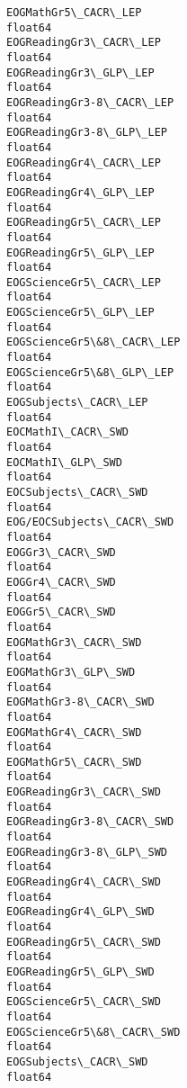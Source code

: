\documentclass[11pt]{article}
\begin{document}
\begin{Verbatim}[commandchars=\\\{\}]
EOGMathGr5\_CACR\_LEP                                             float64
EOGReadingGr3\_CACR\_LEP                                          float64
EOGReadingGr3\_GLP\_LEP                                           float64
EOGReadingGr3-8\_CACR\_LEP                                        float64
EOGReadingGr3-8\_GLP\_LEP                                         float64
EOGReadingGr4\_CACR\_LEP                                          float64
EOGReadingGr4\_GLP\_LEP                                           float64
EOGReadingGr5\_CACR\_LEP                                          float64
EOGReadingGr5\_GLP\_LEP                                           float64
EOGScienceGr5\_CACR\_LEP                                          float64
EOGScienceGr5\_GLP\_LEP                                           float64
EOGScienceGr5\&8\_CACR\_LEP                                        float64
EOGScienceGr5\&8\_GLP\_LEP                                         float64
EOGSubjects\_CACR\_LEP                                            float64
EOCMathI\_CACR\_SWD                                               float64
EOCMathI\_GLP\_SWD                                                float64
EOCSubjects\_CACR\_SWD                                            float64
EOG/EOCSubjects\_CACR\_SWD                                        float64
EOGGr3\_CACR\_SWD                                                 float64
EOGGr4\_CACR\_SWD                                                 float64
EOGGr5\_CACR\_SWD                                                 float64
EOGMathGr3\_CACR\_SWD                                             float64
EOGMathGr3\_GLP\_SWD                                              float64
EOGMathGr3-8\_CACR\_SWD                                           float64
EOGMathGr4\_CACR\_SWD                                             float64
EOGMathGr5\_CACR\_SWD                                             float64
EOGReadingGr3\_CACR\_SWD                                          float64
EOGReadingGr3-8\_CACR\_SWD                                        float64
EOGReadingGr3-8\_GLP\_SWD                                         float64
EOGReadingGr4\_CACR\_SWD                                          float64
EOGReadingGr4\_GLP\_SWD                                           float64
EOGReadingGr5\_CACR\_SWD                                          float64
EOGReadingGr5\_GLP\_SWD                                           float64
EOGScienceGr5\_CACR\_SWD                                          float64
EOGScienceGr5\&8\_CACR\_SWD                                        float64
EOGSubjects\_CACR\_SWD                                            float64

\end{Verbatim}
\end{document}
